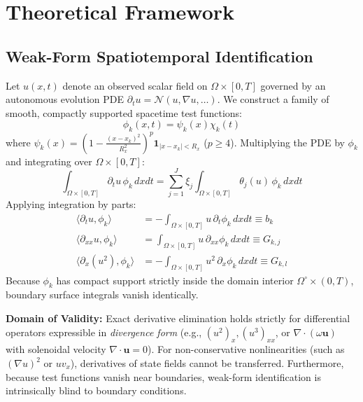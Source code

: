 \documentclass[twocolumn,10pt,a4paper]{article}
\begin{document}
\section{Theoretical Framework}

\subsection{Weak-Form Spatiotemporal Identification}
Let $u(x, t)$ denote an observed scalar field on $\Omega \times [0, T]$ governed by an autonomous evolution PDE $\partial_t u = \mathcal{N}(u, \nabla u, \dots)$. We construct a family of smooth, compactly supported spacetime test functions:
\begin{equation}
\phi_k(x, t) = \psi_k(x) \chi_k(t)
\end{equation}
where $\psi_k(x) = \left(1 - \frac{(x - x_k)^2}{R_x^2}\right)^p \mathbf{1}_{|x - x_k| < R_x}$ ($p \ge 4$). Multiplying the PDE by $\phi_k$ and integrating over $\Omega \times [0, T]$:
\begin{equation}
\int_{\Omega \times [0, T]} \partial_t u \, \phi_k \, dx dt = \sum_{j=1}^J \xi_j \int_{\Omega \times [0, T]} \theta_j(u) \, \phi_k \, dx dt
\end{equation}
Applying integration by parts:
\begin{align}
\langle \partial_t u, \phi_k \rangle &= - \int_{\Omega \times [0, T]} u \, \partial_t \phi_k \, dx dt \equiv b_k \\
\langle \partial_{xx} u, \phi_k \rangle &= \int_{\Omega \times [0, T]} u \, \partial_{xx} \phi_k \, dx dt \equiv G_{k, j} \\
\langle \partial_x (u^2), \phi_k \rangle &= - \int_{\Omega \times [0, T]} u^2 \, \partial_x \phi_k \, dx dt \equiv G_{k, l}
\end{align}
Because $\phi_k$ has compact support strictly inside the domain interior $\Omega^\circ \times (0, T)$, boundary surface integrals vanish identically. 

\textbf{Domain of Validity:} Exact derivative elimination holds strictly for differential operators expressible in \emph{divergence form} (e.g., $(u^2)_x, (u^3)_{xx}$, or $\nabla \cdot (\omega \mathbf{u})$ with solenoidal velocity $\nabla \cdot \mathbf{u} = 0$). For non-conservative nonlinearities (such as $(\nabla u)^2$ or $u v_x$), derivatives of state fields cannot be transferred. Furthermore, because test functions vanish near boundaries, weak-form identification is intrinsically blind to boundary conditions.
\end{document}
